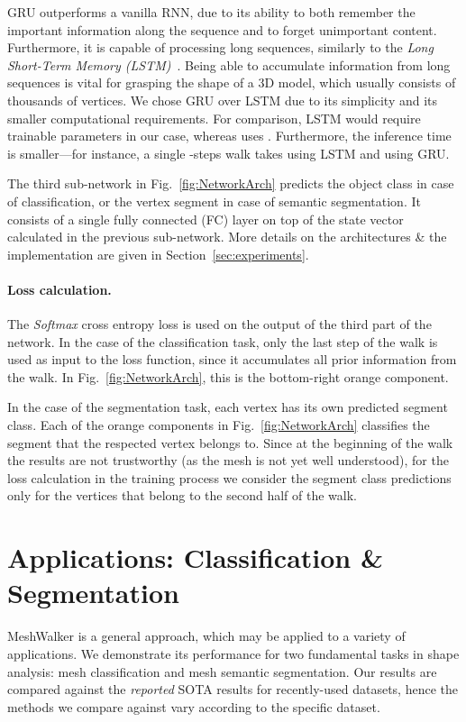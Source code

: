 \documentclass[acmtog]{acmart}
\begin{document}
GRU  outperforms a vanilla RNN, due to its ability to both remember the important information along the sequence and to forget unimportant content.
Furthermore, it is capable of processing long sequences, similarly to the {\em Long Short-Term Memory (LSTM)}~\cite{hochreiter1997long}.
Being able to  accumulate information from long sequences is vital for grasping the shape of a 3D model, which usually consists of thousands of vertices. 
We chose GRU over LSTM due to its simplicity and its smaller computational requirements.
For comparison, LSTM would require  trainable parameters in our case, whereas  uses .
Furthermore, the inference time is smaller---for instance, a single -steps walk takes  using LSTM and  using GRU.

The third sub-network in Fig.~\ref{fig:NetworkArch} predicts the object class in case of classification,  
or the vertex segment in case of semantic segmentation. 
It consists of a single fully connected (FC) layer on top of the state vector calculated in the previous sub-network.
More details on the architectures \& the implementation are given in Section~\ref{sec:experiments}.

\paragraph{Loss calculation.}
The {\em Softmax} cross entropy loss is used on the output of the third part of the network.
In the case of the classification task, only the last step of the walk is used as input to the loss function, since it accumulates all prior information from the walk. 
In Fig.~\ref{fig:NetworkArch}, this is the bottom-right orange component.

In the case of the segmentation task,
each vertex has its own predicted segment class.
Each of the orange components in Fig.~\ref{fig:NetworkArch} classifies the segment that the respected vertex belongs to. 
Since at the beginning of the walk the results are not trustworthy (as the mesh is not yet well understood), for the loss calculation in the training process we consider the segment class predictions only for the vertices that belong to the second half of the walk.


\section{Applications: Classification \& Segmentation}
\label{sec:applications}
MeshWalker is a general approach, which may be applied to a variety of applications.
We demonstrate its performance for two fundamental tasks in shape analysis: mesh classification and mesh semantic segmentation. 
Our results are compared against the {\em reported} SOTA results for recently-used datasets, hence the methods we compare against vary according to the specific dataset.
\end{document}
